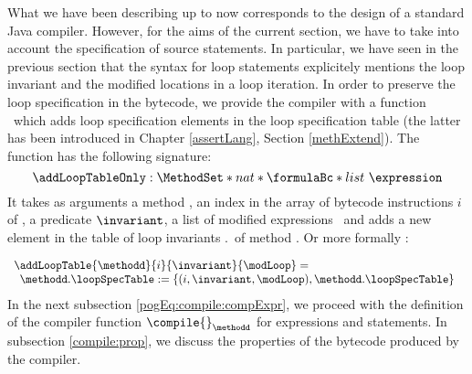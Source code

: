  What we have been describing up to now  corresponds to the design of a standard Java compiler. However, for the aims of the current section, we
 have to take into account the specification of source statements. In particular, we have seen in the previous section that the syntax for loop statements explicitely
 mentions the loop invariant and the modified locations in a loop iteration. In order to preserve the loop specification in the bytecode, we provide the compiler with a function 
 \addLoopTableOnly \ which adds  loop specification elements in the loop specification table (the latter has been introduced in
 Chapter \ref{assertLang}, Section \ref{methExtend}). The function has the following signature:
 $$ \addLoopTableOnly : \MethodSet  *  nat *  \formulaBc  *  list \ \expression $$
 It  takes as arguments a method \methodd, an index in the array of bytecode instructions $i$ of \methodd, 
 a predicate $\invariant$, a list of modified expressions \modLoop \ 
 and adds a new element in the table of loop invariants 
 \methodd.\loopSpecTable \ of method \methodd.
 Or more formally :
 
 $$ \begin{array}{l}
  \addLoopTable{\methodd}{ i }{ \invariant  }{ \modLoop} =  \\
   
   \begin{array}{l}
         
         \methodd.\loopSpecTable := \{ (i,\invariant , \modLoop  ) , \methodd.\loopSpecTable \}

   \end{array}
   \end{array}$$
 In  the next subsection \ref{pogEq:compile:compExpr},  we proceed with the definition of the compiler function $\compile{ }_{\methodd} $ for expressions and statements. 
 In subsection \ref{compile:prop}, we discuss the properties of the bytecode produced by the compiler.




%


